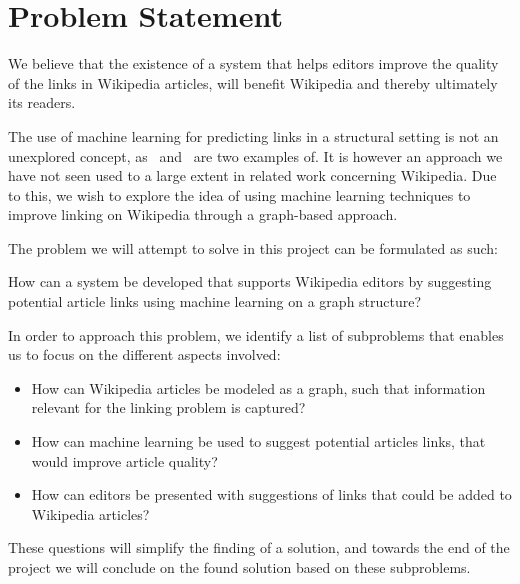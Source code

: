 \section{Problem Statement}\label{sec:problem_statement}
We believe that the existence of a system that helps editors improve the quality of the links in Wikipedia articles, will benefit Wikipedia and thereby ultimately its readers.

The use of machine learning for predicting links in a structural setting is not an unexplored concept, as~\cite{tang2015line} and~\cite{al2006link} are two examples of. It is however an approach we have not seen used to a large extent in related work concerning Wikipedia. Due to this, we wish to explore the idea of using machine learning techniques to improve linking on Wikipedia through a graph-based approach.

The problem we will attempt to solve in this project can be formulated as such:
\vspace{1ex} %
\begin{formal}
How can a system be developed that supports Wikipedia editors by suggesting potential article links using machine learning on a graph structure?
\end{formal}

In order to approach this problem, we identify a list of subproblems that enables us to focus on the different aspects involved:

\newcommand{\subproblems}{
\begin{itemize}
  \item How can Wikipedia articles be modeled as a graph, such that information relevant for the linking problem is captured?
  \item How can machine learning be used to suggest potential articles links, that would improve article quality?
  \item How can editors be presented with suggestions of links that could be added to Wikipedia articles?
\end{itemize}}

\subproblems

These questions will simplify the finding of a solution, and towards the end of the project we will conclude on the found solution based on these subproblems.

